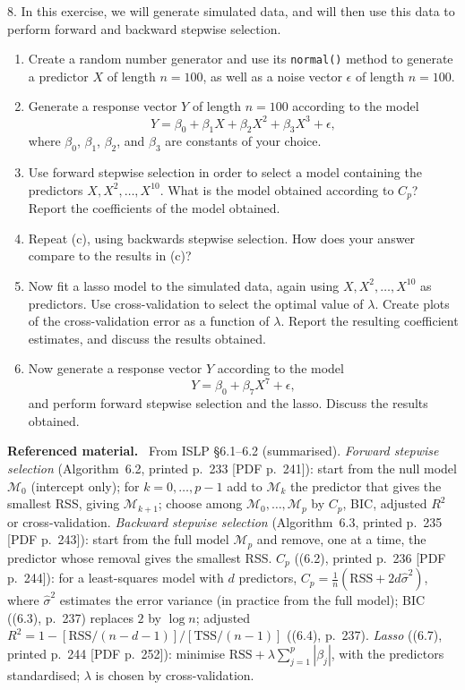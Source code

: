 \documentclass[11pt,a4paper]{article}
\numberwithin{equation}{questao}   %
\newenvironment{refmat}{\par\smallskip\noindent\small\textbf{Referenced material.}\ }{\par\smallskip}
\begin{document}
8. In this exercise, we will generate simulated data, and will then use this data to perform forward
and backward stepwise selection.
\begin{enumerate}[label=(\alph*),leftmargin=2.4em]
\item Create a random number generator and use its \texttt{normal()} method to generate a predictor
$X$ of length $n=100$, as well as a noise vector $\epsilon$ of length $n=100$.
\item Generate a response vector $Y$ of length $n=100$ according to the model
\[ Y=\beta_0+\beta_1X+\beta_2X^2+\beta_3X^3+\epsilon, \]
where $\beta_0$, $\beta_1$, $\beta_2$, and $\beta_3$ are constants of your choice.
\item Use forward stepwise selection in order to select a model containing the predictors
$X,X^2,\dots,X^{10}$. What is the model obtained according to $C_p$? Report the coefficients of the
model obtained.
\item Repeat (c), using backwards stepwise selection. How does your answer compare to the results in
(c)?
\item Now fit a lasso model to the simulated data, again using $X,X^2,\dots,X^{10}$ as predictors.
Use cross-validation to select the optimal value of $\lambda$. Create plots of the cross-validation
error as a function of $\lambda$. Report the resulting coefficient estimates, and discuss the results
obtained.
\item Now generate a response vector $Y$ according to the model
\[ Y=\beta_0+\beta_7X^7+\epsilon, \]
and perform forward stepwise selection and the lasso. Discuss the results obtained.
\end{enumerate}
\begin{refmat}
From ISLP §6.1--6.2 (summarised). \emph{Forward stepwise selection} (Algorithm~6.2, printed p.~233
[PDF p.~241]): start from the null model $\mathcal M_0$ (intercept only); for $k=0,\dots,p-1$ add to
$\mathcal M_k$ the predictor that gives the smallest RSS, giving $\mathcal M_{k+1}$; choose among
$\mathcal M_0,\dots,\mathcal M_p$ by $C_p$, BIC, adjusted $R^2$ or cross-validation. \emph{Backward
stepwise selection} (Algorithm~6.3, printed p.~235 [PDF p.~243]): start from the full model
$\mathcal M_p$ and remove, one at a time, the predictor whose removal gives the smallest RSS.
\emph{$C_p$} ((6.2), printed p.~236 [PDF p.~244]): for a least-squares model with $d$ predictors,
$C_p=\frac1n(\mathrm{RSS}+2d\hat\sigma^2)$, where $\hat\sigma^2$ estimates the error variance (in
practice from the full model); BIC ((6.3), p.~237) replaces $2$ by $\log n$; adjusted
$R^2=1-[\mathrm{RSS}/(n-d-1)]/[\mathrm{TSS}/(n-1)]$ ((6.4), p.~237). \emph{Lasso} ((6.7), printed p.~244
[PDF p.~252]): minimise $\mathrm{RSS}+\lambda\sum_{j=1}^p|\beta_j|$, with the predictors standardised;
$\lambda$ is chosen by cross-validation.
\end{refmat}
\end{document}
